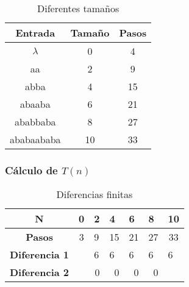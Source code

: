 \documentclass{uc3mpracticas}
\begin{document}
  \begin{table}[!h]
    \centering
  \begin{tabular}{|c|c|c|}
  \hline

  \textbf{Entrada} & \textbf{Tamaño} & \textbf{Pasos} \\ \hline

  $\lambda$           & 0               & 4              \\ \hline
  aa               & 2               & 9              \\ \hline
  abba             & 4               & 15             \\ \hline
  abaaba           & 6               & 21             \\ \hline
  ababbaba         & 8               & 27             \\ \hline
  ababaababa       & 10              & 33             \\ \hline
  \end{tabular}
  \caption{Diferentes tamaños}
  \end{table}






  \subsubsection{Cálculo de $T(n)$}


  \begin{table}[!h]
    \centering
    \begin{tabular}{|c|p{1cm}|p{1cm}|p{1cm}|p{1cm}|p{1cm}|p{1cm}|}  \hline
  \textbf{N}     & \multicolumn{1}{c|}{\textbf{0}} & \textbf{2} & \textbf{4}             & \textbf{6}             & \textbf{8}             & \multicolumn{1}{c|}{\textbf{10}} \\ \hline
  \textbf{Pasos} & \multicolumn{1}{c|}{3}          & 9          & 15                     & 21                     & 27                     & \multicolumn{1}{c|}{33}          \\ \hline
  \textbf{Diferencia 1}                  &                                                         & \multicolumn{1}{l|}{6}             & \multicolumn{1}{l|}{6} & \multicolumn{1}{l|}{6} & \multicolumn{1}{l|}{6} & 6                                \\ \hline
  \textbf{Diferencia 2}                  &                                                         & \multicolumn{1}{r|}{0}             & \multicolumn{1}{r|}{0} & \multicolumn{1}{r|}{0} & \multicolumn{1}{r|}{0} &                                  \\ \hline
  \end{tabular}
  \caption{Diferencias finitas}
  \end{table}
\end{document}

